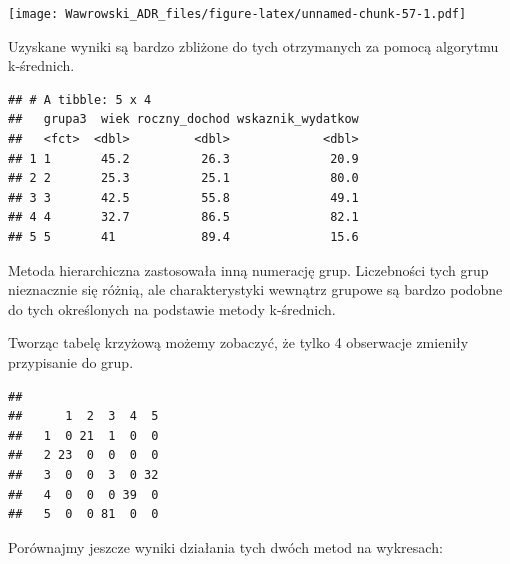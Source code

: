 \documentclass[]{book}
\newenvironment{Shaded}{\begin{snugshade}}{\end{snugshade}}
\newcommand{\DataTypeTok}[1]{\textcolor[rgb]{0.13,0.29,0.53}{#1}}
\newcommand{\KeywordTok}[1]{\textcolor[rgb]{0.13,0.29,0.53}{\textbf{#1}}}
\newcommand{\NormalTok}[1]{#1}
\newcommand{\OperatorTok}[1]{\textcolor[rgb]{0.81,0.36,0.00}{\textbf{#1}}}
\newcommand{\StringTok}[1]{\textcolor[rgb]{0.31,0.60,0.02}{#1}}
\begin{document}
\texttt{[image: Wawrowski\_ADR\_files/figure-latex/unnamed-chunk-57-1.pdf]}

Uzyskane wyniki są bardzo zbliżone do tych otrzymanych za pomocą algorytmu k-średnich.

\begin{Shaded}
\end{Shaded}

\begin{verbatim}
## # A tibble: 5 x 4
##   grupa3  wiek roczny_dochod wskaznik_wydatkow
##   <fct>  <dbl>         <dbl>             <dbl>
## 1 1       45.2          26.3              20.9
## 2 2       25.3          25.1              80.0
## 3 3       42.5          55.8              49.1
## 4 4       32.7          86.5              82.1
## 5 5       41            89.4              15.6
\end{verbatim}

Metoda hierarchiczna zastosowała inną numerację grup. Liczebności tych grup nieznacznie się różnią, ale charakterystyki wewnątrz grupowe są bardzo podobne do tych określonych na podstawie metody k-średnich.

Tworząc tabelę krzyżową możemy zobaczyć, że tylko 4 obserwacje zmieniły przypisanie do grup.

\begin{Shaded}
\end{Shaded}

\begin{verbatim}
##    
##      1  2  3  4  5
##   1  0 21  1  0  0
##   2 23  0  0  0  0
##   3  0  0  3  0 32
##   4  0  0  0 39  0
##   5  0  0 81  0  0
\end{verbatim}

Porównajmy jeszcze wyniki działania tych dwóch metod na wykresach:
\end{document}
